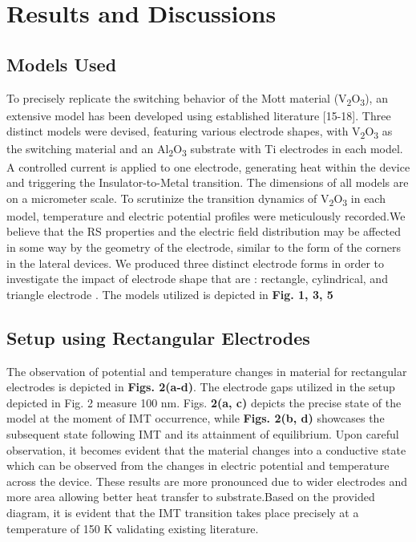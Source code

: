 \documentclass[conference]{IEEEtran}
\begin{document}
\section{Results and Discussions}
\subsection{ Models Used}\label{AA}

To precisely replicate the switching behavior of the Mott material (V\textsubscript{2}O\textsubscript{3}), an extensive model has been developed using established literature [15-18]. Three distinct models were devised, featuring various electrode shapes, with V\textsubscript{2}O\textsubscript{3} as the switching material and an Al\textsubscript{2}O\textsubscript{3} substrate with Ti electrodes in each model. A controlled current is applied to one electrode, generating heat within the device and triggering the Insulator-to-Metal transition. The dimensions of all models are on a micrometer scale. To scrutinize the transition dynamics of V\textsubscript{2}O\textsubscript{3} in each model, temperature and electric potential profiles were meticulously recorded.We believe that the RS properties and the electric field distribution may be affected in some way by the geometry of the electrode, similar to the form of the corners in the lateral devices. We produced three distinct electrode forms in order to investigate the impact of electrode shape that are
: rectangle, cylindrical, and triangle electrode . The models utilized is depicted in \textbf{Fig. 1, 3, 5}



\subsection{Setup using Rectangular Electrodes}

The observation of potential and temperature changes in material for rectangular electrodes is depicted in \textbf{Figs. 2(a-d)}. The electrode gaps utilized in the setup depicted in Fig. 2 measure 100 nm. Figs.  \textbf{2(a, c)} depicts the precise state of the model at the moment of IMT occurrence, while \textbf{Figs. 2(b, d)} showcases the subsequent state following IMT and its attainment of equilibrium. Upon careful observation, it becomes evident that the material changes into a conductive state which can be observed from the changes in electric potential and temperature across the device. These results are more pronounced due to wider electrodes and more area allowing better heat transfer to substrate.Based on the provided diagram, it is evident that the IMT transition takes place precisely at a temperature of 150 K validating existing literature.
\end{document}
